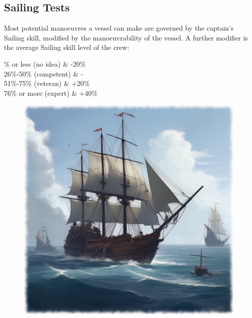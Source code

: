 \subsection{Sailing Tests}
Most potential manoeuvres a vessel can make are governed by the captain’s Sailing skill, modified by the manoeuvrability of the vessel. A further modifier is the average Sailing skill level of the crew:
\begin{table}[H]
\begin{center}
\begin{rpg-table}[|X|Y|]
        \% or less (no idea) & -20\%\\
	26\%-50\% (competent) & -\\
	51\%-75\% (veteran) & +20\%\\
	76\% or more (expert) & +40\%\\
	\hline
\end{rpg-table}
\end{center}
\end{table}

\begin{figure}
\begin{center}
  \includegraphics[scale=0.24]{img/ai-images/ships.png}
\end{center}
\end{figure}

